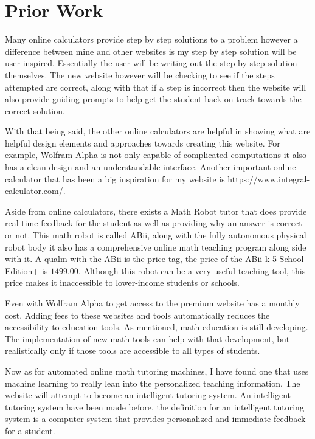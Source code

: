 \documentclass[10pt,twocolumn]{article}
\begin{document}
\section{Prior Work}
Many online calculators provide step by step solutions to a problem however a difference between mine and other websites is my step by step solution will be user-inspired. Essentially the user will be writing out the step by step solution themselves. The new website however will be checking to see if the steps attempted are correct, along with that if a step is incorrect then the website will also provide guiding prompts to help get the student back on track towards the correct solution. 

With that being said, the other online calculators are helpful in showing what are helpful design elements and approaches towards creating this website. For example, Wolfram Alpha is not only capable of complicated computations it also has a clean design and an understandable interface. Another important online calculator that has been a big inspiration for my website is https://www.integral-calculator.com/. 

Aside from online calculators, there exists a Math Robot tutor that does provide real-time feedback for the student as well as providing why an answer is correct or not. This math robot is called ABii, along with the fully autonomous physical robot body it also has a comprehensive online math teaching program along side with it. A qualm with the ABii is  the price tag, the price of the ABii k-5 School Edition+ is $1499.00$. Although this robot can be a very useful teaching tool, this price makes it inaccessible to lower-income students or schools. 

Even with Wolfram Alpha to get access to the premium website has a monthly cost. Adding fees to these websites and tools automatically reduces the accessibility to education tools. As mentioned, math education is still developing. The implementation of new math tools can help with that development, but realistically only if those tools are accessible to all types of students. 

Now as for automated online math tutoring machines, I have found one that uses machine learning to really lean into the personalized teaching information. The website will attempt to become an intelligent tutoring system. An intelligent tutoring system have been made before, the definition for an intelligent tutoring system is a computer system that provides personalized and immediate feedback for a student.  
\end{document}
